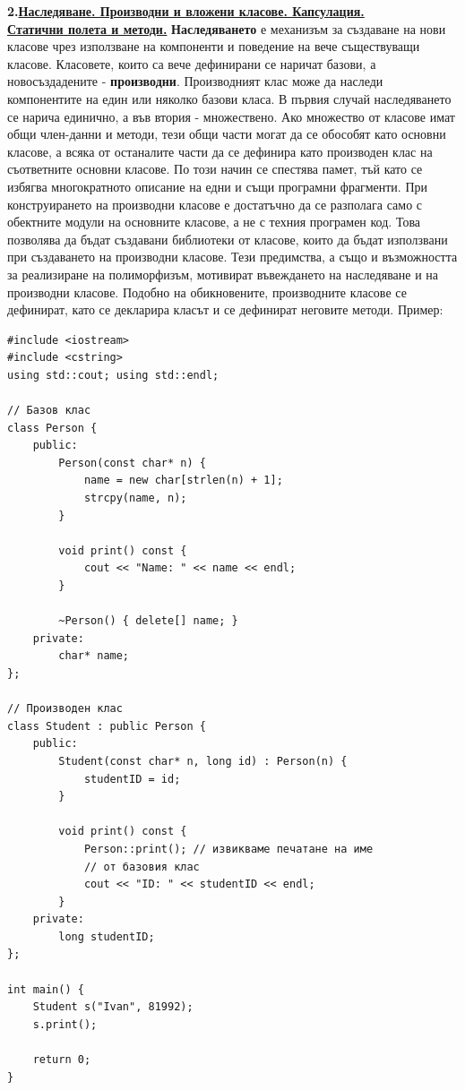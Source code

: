 \documentclass{article}
\begin{document}
\textbf{2.\underline{Наследяване. Производни и вложени класове. Капсулация.} \\ \underline{Статични полета и методи.}} \newline\newline
\textbf{Наследяването} е механизъм за създаване на нови класове чрез използване на компоненти и поведение на вече съществуващи класове.
Класовете, които са вече дефинирани се наричат базови, а новосъздадените - \textbf{производни}. Производният клас може да наследи
компонентите на един или няколко базови класа. В първия случай наследяването се нарича единично, а във втория - множествено.
Ако множество от класове имат общи член-данни и методи, тези общи части могат да се обособят като основни класове, а всяка от
останалите части да се дефинира като производен клас на съответните основни класове. По този начин се спестява памет, тъй като
се избягва многократното описание на едни и същи програмни фрагменти. При конструирането на производни класове е достатъчно да
се разполага само с обектните модули на основните класове, а не с техния програмен код. Това позволява да бъдат създавани библиотеки
от класове, които да бъдат използвани при създаването на производни класове. Тези предимства, а също и възможността за реализиране
на полиморфизъм, мотивират въвеждането на наследяване и на производни класове. Подобно на обикновените, производните класове се
дефинират, като се декларира класът и се дефинират неговите методи. \newline\newline
Пример: \begin{lstlisting}[style=cpp]
#include <iostream>
#include <cstring>
using std::cout; using std::endl;

// Базов клас
class Person {
    public:
        Person(const char* n) {
            name = new char[strlen(n) + 1];
            strcpy(name, n);
        }

        void print() const {
            cout << "Name: " << name << endl;
        }

        ~Person() { delete[] name; }
    private:
        char* name;
};

// Производен клас
class Student : public Person {
    public:
        Student(const char* n, long id) : Person(n) {
            studentID = id;
        }

        void print() const {
            Person::print(); // извикваме печатане на име
            // от базовия клас
            cout << "ID: " << studentID << endl;
        }
    private:
        long studentID;
};

int main() {
    Student s("Ivan", 81992);
    s.print();

    return 0;
}
\end{lstlisting}
\end{document}
